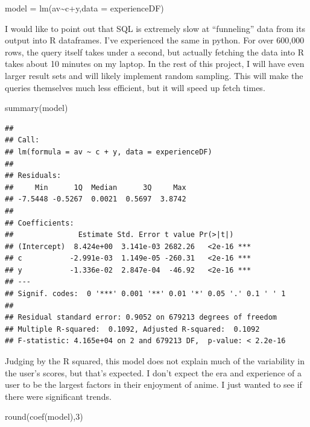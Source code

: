 \documentclass[
]{article}
\newenvironment{Shaded}{\begin{snugshade}}{\end{snugshade}}
\newcommand{\AttributeTok}[1]{\textcolor[rgb]{0.77,0.63,0.00}{#1}}
\newcommand{\DecValTok}[1]{\textcolor[rgb]{0.00,0.00,0.81}{#1}}
\newcommand{\FunctionTok}[1]{\textcolor[rgb]{0.00,0.00,0.00}{#1}}
\newcommand{\NormalTok}[1]{#1}
\newcommand{\OtherTok}[1]{\textcolor[rgb]{0.56,0.35,0.01}{#1}}
\newcommand{\SpecialCharTok}[1]{\textcolor[rgb]{0.00,0.00,0.00}{#1}}
\begin{document}
\begin{Shaded}
\begin{Highlighting}[]
\NormalTok{model }\OtherTok{=} \FunctionTok{lm}\NormalTok{(av}\SpecialCharTok{\textasciitilde{}}\NormalTok{c}\SpecialCharTok{+}\NormalTok{y,}\AttributeTok{data =}\NormalTok{ experienceDF)}
\end{Highlighting}
\end{Shaded}

I would like to point out that SQL is extremely slow at ``funneling''
data from its output into R dataframes. I've experienced the same in
python. For over 600,000 rows, the query itself takes under a second,
but actually fetching the data into R takes about 10 minutes on my
laptop. In the rest of this project, I will have even larger result sets
and will likely implement random sampling. This will make the queries
themselves much less efficient, but it will speed up fetch times.

\begin{Shaded}
\begin{Highlighting}[]
\FunctionTok{summary}\NormalTok{(model)}
\end{Highlighting}
\end{Shaded}

\begin{verbatim}
## 
## Call:
## lm(formula = av ~ c + y, data = experienceDF)
## 
## Residuals:
##     Min      1Q  Median      3Q     Max 
## -7.5448 -0.5267  0.0021  0.5697  3.8742 
## 
## Coefficients:
##               Estimate Std. Error t value Pr(>|t|)    
## (Intercept)  8.424e+00  3.141e-03 2682.26   <2e-16 ***
## c           -2.991e-03  1.149e-05 -260.31   <2e-16 ***
## y           -1.336e-02  2.847e-04  -46.92   <2e-16 ***
## ---
## Signif. codes:  0 '***' 0.001 '**' 0.01 '*' 0.05 '.' 0.1 ' ' 1
## 
## Residual standard error: 0.9052 on 679213 degrees of freedom
## Multiple R-squared:  0.1092, Adjusted R-squared:  0.1092 
## F-statistic: 4.165e+04 on 2 and 679213 DF,  p-value: < 2.2e-16
\end{verbatim}

Judging by the R squared, this model does not explain much of the
variability in the user's scores, but that's expected. I don't expect
the era and experience of a user to be the largest factors in their
enjoyment of anime. I just wanted to see if there were significant
trends.

\begin{Shaded}
\begin{Highlighting}[]
\FunctionTok{round}\NormalTok{(}\FunctionTok{coef}\NormalTok{(model),}\DecValTok{3}\NormalTok{)}
\end{Highlighting}
\end{Shaded}
\end{document}
